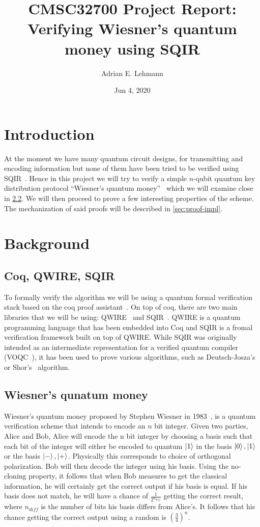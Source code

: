\documentclass{article}
\title{CMSC32700 Project Report: Verifying Wiesner's quantum money using SQIR}
\author{Adrian E. Lehmann}
\date{Jun 4, 2020}
\begin{document}
\maketitle

\section{Introduction}
At the moment we have many quantum circuit designs, for transmitting and encoding information but none of them have been tried to be verified using SQIR~\cite{SQIR}. 
Hence in this project we will try to verify a simple $n$-qubit quantum key distribution protocol ``Wiesner's quantum money''~\cite{wiesner} which we will examine close in \cref{sec:wiesner}. 
We will then proceed to prove a few interesting properties of the scheme.
The mechanization of said proofs will be described in \cref{sec:proof-impl}.

\section{Background}

\subsection{Coq, QWIRE, SQIR}
To formally verify the algorithm we will be using a quantum formal verification stack based on the coq proof assistant~\cite{coq}.
On top of coq, there are two main libraries that we will be using: QWIRE~\cite{QWIRE} and SQIR~\cite{SQIR}.
QWIRE is a quantum programming language that has been embedded into Coq and SQIR is a fromal verification framework built on top of QWIRE.
While SQIR was originally intended as an intermediate representation for a verified quantum compiler (VOQC~\cite{voqc}), it has been used to prove various algorithms, such as Deutsch-Josza's~\cite{deutsch} or Shor's~\cite{shor} algorithm.


\subsection{Wiesner's qunatum money}\label{sec:wiesner}

Wiesner's quantum money proposed by Stephen Wiesner in 1983~\cite{wiesner}, is a quantum verification scheme that intends to encode an $n$ bit integer. 
Given two parties, Alice and Bob, Alice will encode the n bit integer by choosing a basis such that each bit of the integer will either be encoded to quantum $\ket{1}$ in the basis $\ket{0}, \ket{1}$ or the basis $\ket{-},\ket{+}$.
Physically this corresponds to choice of orthogonal polarization.
Bob will then decode the integer using his basis.
Using the no-cloning property, it follows that when Bob measures to get the classical information, he will certainly get the correct output if his basis is equal.
If his basis does not match, he will have a chance of $\frac{1}{2^{n_{diff}}}$ getting the correct result, where $n_{diff}$ is the number of bits his basis differs from Alice's.
It follows that his chance getting the correct output using a random is $(\frac{3}{4})^n$.
\end{document}
